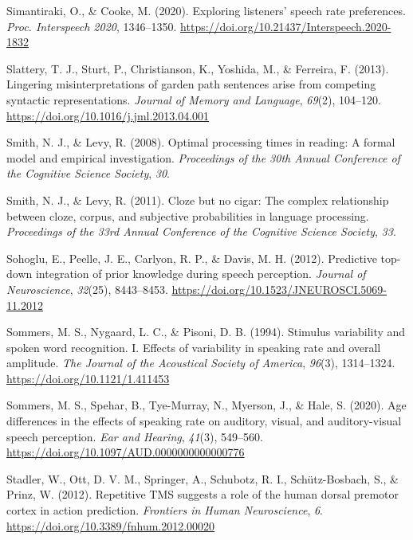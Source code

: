 \documentclass[a4paper, nobind]{templates/ociamthesis}
\newlength{\cslhangindent}
\newenvironment{CSLReferences}[2] %
 {%
  \setlength{\parindent}{0pt}
  \ifodd #1
  \let\oldpar\par
  \def\par{\hangindent=\cslhangindent\oldpar}
  \fi
  \setlength{\parskip}{1mm}
  \setlength{\baselineskip}{6mm}
 }%
 {}
\begin{document}
\begin{CSLReferences}{1}{0}
\leavevmode{}%
Simantiraki, O., \& Cooke, M. (2020). {Exploring listeners' speech rate preferences}. \emph{Proc. Interspeech 2020}, 1346--1350. \url{https://doi.org/10.21437/Interspeech.2020-1832}

\leavevmode{}%
Slattery, T. J., Sturt, P., Christianson, K., Yoshida, M., \& Ferreira, F. (2013). Lingering misinterpretations of garden path sentences arise from competing syntactic representations. \emph{Journal of Memory and Language}, \emph{69}(2), 104--120. \url{https://doi.org/10.1016/j.jml.2013.04.001}

\leavevmode{}%
Smith, N. J., \& Levy, R. (2008). Optimal processing times in reading: A formal model and empirical investigation. \emph{Proceedings of the 30th Annual Conference of the Cognitive Science Society}, \emph{30}.

\leavevmode{}%
Smith, N. J., \& Levy, R. (2011). Cloze but no cigar: The complex relationship between cloze, corpus, and subjective probabilities in language processing. \emph{Proceedings of the 33rd Annual Conference of the Cognitive Science Society}, \emph{33}.

\leavevmode{}%
Sohoglu, E., Peelle, J. E., Carlyon, R. P., \& Davis, M. H. (2012). {Predictive top-down integration of prior knowledge during speech perception}. \emph{Journal of Neuroscience}, \emph{32}(25), 8443--8453. \url{https://doi.org/10.1523/JNEUROSCI.5069-11.2012}

\leavevmode{}%
Sommers, M. S., Nygaard, L. C., \& Pisoni, D. B. (1994). Stimulus variability and spoken word recognition. I. Effects of variability in speaking rate and overall amplitude. \emph{The Journal of the Acoustical Society of America}, \emph{96}(3), 1314--1324. \url{https://doi.org/10.1121/1.411453}

\leavevmode{}%
Sommers, M. S., Spehar, B., Tye-Murray, N., Myerson, J., \& Hale, S. (2020). Age differences in the effects of speaking rate on auditory, visual, and auditory-visual speech perception. \emph{Ear and Hearing}, \emph{41}(3), 549--560. \url{https://doi.org/10.1097/AUD.0000000000000776}

\leavevmode{}%
Stadler, W., Ott, D. V. M., Springer, A., Schubotz, R. I., Schütz-Bosbach, S., \& Prinz, W. (2012). Repetitive TMS suggests a role of the human dorsal premotor cortex in action prediction. \emph{Frontiers in Human Neuroscience}, \emph{6}. \url{https://doi.org/10.3389/fnhum.2012.00020}


\end{CSLReferences}
\end{document}
